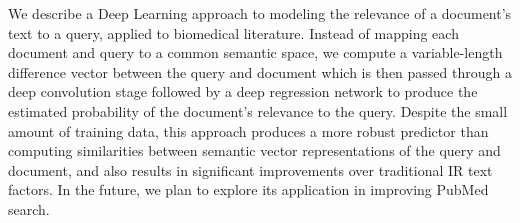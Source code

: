 We describe a Deep Learning approach to modeling the relevance of a document's text to a query, applied to biomedical literature. Instead of mapping each document and query to a common semantic space, we compute a variable-length difference vector between the query and document which is then passed through a deep convolution stage followed by a deep regression network to produce the estimated probability of the document's relevance to the query. Despite the small amount of training data, this approach produces a more robust predictor than computing similarities between semantic vector representations of the query and document, and also results in significant improvements over traditional IR text factors. In the future, we plan to explore its application in improving PubMed search.
